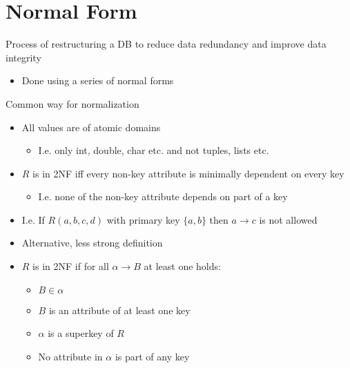 
\section{Normal Form}
\begin{itemize}
     Process of restructuring a DB to reduce data redundancy and improve data integrity
        \begin{itemize}
            \item Done using a series of normal forms
        \end{itemize}
     Common way for normalization
        \begin{itemize}
            \item All values are of atomic domains
                \begin{itemize}
                    \item I.e. only int, double, char etc. and not tuples, lists etc.
                \end{itemize}
        \end{itemize}
        \begin{itemize}
            \item $R$ is in 2NF iff every non-key attribute is minimally dependent on every key
                \begin{itemize}
                     No attribute depends on part of a key
                    \item I.e. none of the non-key attribute depends on part of a key
                \end{itemize}
            \item I.e. If $R(a, b, c, d)$ with primary key $\{a, b\}$ then $a \to c$ is not allowed
            \item Alternative, less strong definition
            \item $R$ is in 2NF if for all $\alpha \to B$ at least one holds:
                \begin{itemize}
                    \item $B \in \alpha$
                    \item $B$ is an attribute of at least one key
                    \item $\alpha$ is a superkey of $R$
                    \item No attribute in $\alpha$ is part of any key

\end{itemize}
\end{itemize}
\end{itemize}
